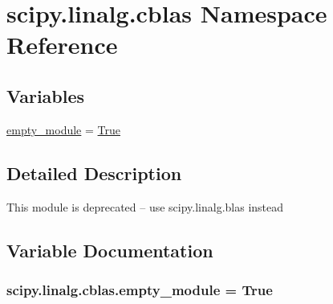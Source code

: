 \hypertarget{namespacescipy_1_1linalg_1_1cblas}{}\section{scipy.\+linalg.\+cblas Namespace Reference}
\label{namespacescipy_1_1linalg_1_1cblas}
\subsection*{Variables}
\begin{DoxyCompactItemize}
\item 
\hyperlink{namespacescipy_1_1linalg_1_1cblas_ab07e67da42907695fe9a22e6530e150d}{empty\+\_\+module} = \hyperlink{libqhull_8h_add3ca9eefe3b5b754426f51d3043e579}{True}
\end{DoxyCompactItemize}


\subsection{Detailed Description}
\begin{DoxyVerb}This module is deprecated -- use scipy.linalg.blas instead
\end{DoxyVerb}
 

\subsection{Variable Documentation}
\hypertarget{namespacescipy_1_1linalg_1_1cblas_ab07e67da42907695fe9a22e6530e150d}{}
\subsubsection[{empty\+\_\+module}]{\setlength{\rightskip}{0pt plus 5cm}scipy.\+linalg.\+cblas.\+empty\+\_\+module = {\bf True}}\label{namespacescipy_1_1linalg_1_1cblas_ab07e67da42907695fe9a22e6530e150d}
